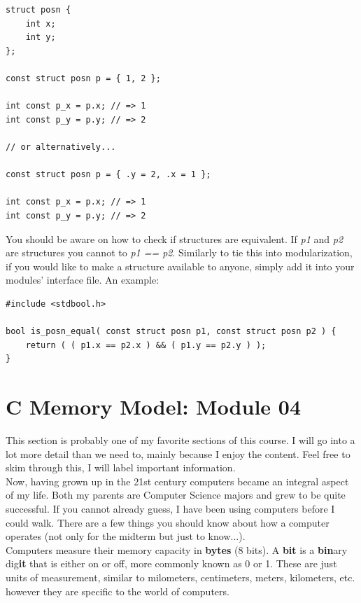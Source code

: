 \documentclass[12pt,extarticle]{article}
\begin{document}
\lstset {
	language=c
}
\begin{lstlisting}
struct posn {
	int x;
	int y;
};

const struct posn p = { 1, 2 };

int const p_x = p.x; // => 1
int const p_y = p.y; // => 2

// or alternatively...

const struct posn p = { .y = 2, .x = 1 };

int const p_x = p.x; // => 1
int const p_y = p.y; // => 2
\end{lstlisting}

You should be aware on how to check if structures are equivalent. If \emph{p1} and \emph{p2} are structures you cannot to \emph{p1 == p2}. Similarly to tie this into modularization, if you would like to make a structure available to anyone, simply add it into your modules' interface file. An example:\\

\lstset {
	language=c
}
\begin{lstlisting}
#include <stdbool.h>

bool is_posn_equal( const struct posn p1, const struct posn p2 ) {
	return ( ( p1.x == p2.x ) && ( p1.y == p2.y ) );
}
\end{lstlisting}

\newpage
\section{C Memory Model: Module 04}

This section is probably one of my favorite sections of this course. I will go into a lot more detail than we need to, mainly because I enjoy the content. Feel free to skim through this, I will label important information.\\

Now, having grown up in the 21st century computers became an integral aspect of my life. Both my parents are Computer Science majors and grew to be quite successful. If you cannot already guess, I have been using computers before I could walk. There are a few things you should know about how a computer operates (not only for the midterm but just to know...).\\

Computers measure their memory capacity in \textbf{bytes} (8 bits). A \textbf{bit} is a \textbf{bin}ary dig\textbf{it} that is either on or off, more commonly known as 0 or 1. These are just units of measurement, similar to milometers, centimeters, meters, kilometers, etc. however they are specific to the world of computers.
\end{document}
